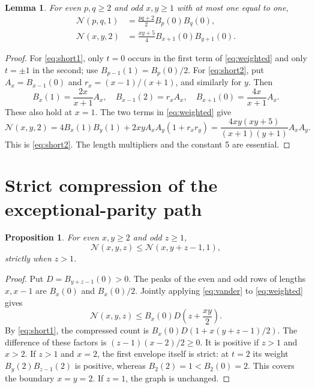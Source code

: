 \documentclass[11pt]{article}
\newtheorem{lemma}[theorem]{Lemma}
\newtheorem{proposition}[theorem]{Proposition}
\theoremstyle{remark}
\newcommand{\N}{\mathcal N}
\begin{document}
\begin{lemma}\label{lem:short}
For even $p,q\ge2$ and odd $x,y\ge1$ with at most one equal to one,
\begin{align}
 \N(p,q,1)&=\frac{pq+2}{2}B_p(0)B_q(0),\label{eq:short1}\\
 \N(x,y,2)&=\frac{xy+5}{4}B_{x+1}(0)B_{y+1}(0).\label{eq:short2}
\end{align}
\end{lemma}
\begin{proof}
For \eqref{eq:short1}, only $t=0$ occurs in the first term of
\eqref{eq:weighted} and only $t=\pm1$ in the second; use
$B_{p-1}(1)=B_p(0)/2$.
For \eqref{eq:short2}, put $A_x=B_{x-1}(0)$ and
$r_x=(x-1)/(x+1)$, and similarly for $y$. Then
\[
 B_x(1)=\frac{2x}{x+1}A_x,\quad B_{x-1}(2)=r_xA_x,\quad
 B_{x+1}(0)=\frac{4x}{x+1}A_x.
\]
These also hold at $x=1$. The two terms in \eqref{eq:weighted} give
\[
 \N(x,y,2)=4B_x(1)B_y(1)+2xyA_xA_y(1+r_xr_y)
 =\frac{4xy(xy+5)}{(x+1)(y+1)}A_xA_y.
\]
This is \eqref{eq:short2}. The length multipliers and the constant 5
are essential.
\end{proof}

\section{Strict compression of the exceptional-parity path}
\begin{proposition}\label{prop:even}
For even $x,y\ge2$ and odd $z\ge1$,
\[
 \N(x,y,z)\le\N(x,y+z-1,1),
\]
strictly when $z>1$.
\end{proposition}
\begin{proof}
Put $D=B_{y+z-1}(0)>0$. The peaks of the even and odd rows of lengths
$x,x-1$ are $B_x(0)$ and $B_x(0)/2$. Jointly applying
\eqref{eq:vander} to \eqref{eq:weighted} gives
\[
 \N(x,y,z)\le B_x(0)D\left(z+\frac{xy}{2}\right).
\]
By \eqref{eq:short1}, the compressed count is
$B_x(0)D(1+x(y+z-1)/2)$. The difference of these factors is
$(z-1)(x-2)/2\ge0$. It is positive if $z>1$ and $x>2$.
If $z>1$ and $x=2$, the first envelope itself is strict: at $t=2$ its
weight $B_y(2)B_{z-1}(2)$ is positive, whereas $B_2(2)=1<B_2(0)=2$.
This covers the boundary $x=y=2$. If $z=1$, the graph is unchanged.
\end{proof}
\end{document}
